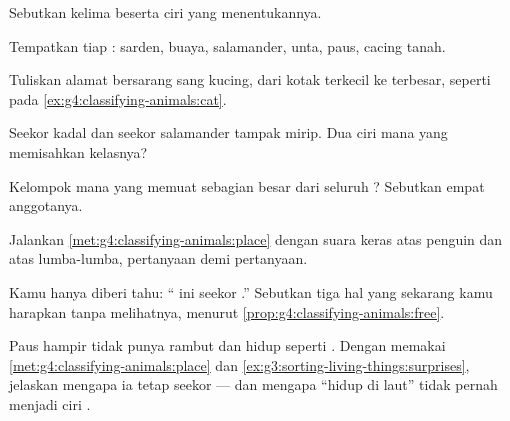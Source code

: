 \begin{exercise}[$\star$]\label{exo:g4:classifying-animals:2}
Sebutkan kelima  beserta ciri yang menentukannya.
\end{exercise}

\begin{exercise}[$\star$]\label{exo:g4:classifying-animals:3}
Tempatkan tiap : sarden, buaya, salamander,  unta, paus,
cacing tanah.
\end{exercise}

\begin{exercise}[$\star$]\label{exo:g4:classifying-animals:4}
Tuliskan alamat bersarang sang kucing, dari kotak terkecil ke
terbesar, seperti pada \cref{ex:g4:classifying-animals:cat}.
\end{exercise}

\begin{exercise}[$\star$]\label{exo:g4:classifying-animals:5}
Seekor kadal dan seekor salamander tampak mirip. Dua ciri mana yang
memisahkan kelasnya?
\end{exercise}

\begin{exercise}[$\star$]\label{exo:g4:classifying-animals:6}
Kelompok mana yang memuat sebagian besar dari seluruh ? Sebutkan
empat anggotanya.
\end{exercise}

\begin{exercise}[$\star$]\label{exo:g4:classifying-animals:7}
Jalankan \cref{met:g4:classifying-animals:place} dengan suara keras
atas penguin dan atas lumba-lumba, pertanyaan demi pertanyaan.
\end{exercise}

\begin{exercise}[$\star$]\label{exo:g4:classifying-animals:8}
Kamu hanya diberi tahu: `` ini seekor .'' Sebutkan tiga hal
yang sekarang kamu harapkan tanpa melihatnya, menurut
\cref{prop:g4:classifying-animals:free}.
\end{exercise}

\begin{exercise}[$\star\star$]\label{exo:g4:classifying-animals:9}
Paus hampir tidak punya rambut dan hidup seperti . Dengan memakai
\cref{met:g4:classifying-animals:place} dan
\cref{ex:g3:sorting-living-things:surprises}, jelaskan mengapa ia
tetap seekor  --- dan mengapa ``hidup di laut'' tidak pernah
menjadi ciri .
\end{exercise}

